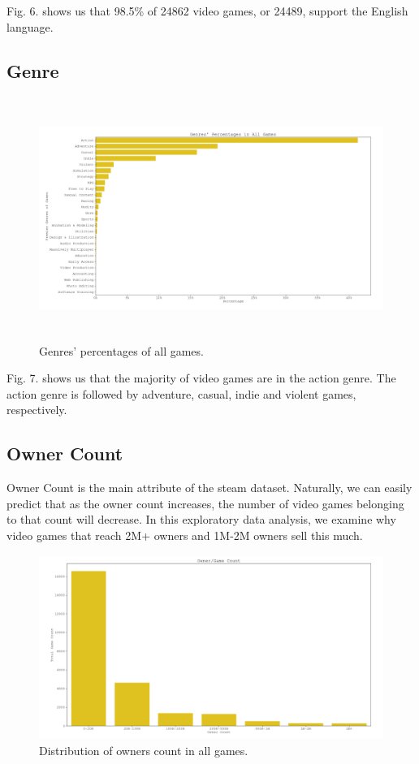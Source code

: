 \documentclass[conference]{IEEEtran}
\begin{document}
Fig. 6. shows us that 98.5\% of 24862 video games, or 24489, support the English language.

\subsection{Genre}


\begin{figure}[h]
  \centering
  \includegraphics[width=\linewidth,height=7.9cm]{assets/genres_dist.png}
  \caption{Genres' percentages of all games.}
  \label{fig:genre1}
\end{figure}

Fig. 7. shows us that the majority of video games are in the action genre. The action genre is followed by adventure, casual, indie and violent games, respectively. \\

\subsection{Owner Count}
Owner Count is the main attribute of the steam dataset. Naturally, we can easily predict that as the owner count increases, the number of video games belonging to that count will decrease. In this exploratory data analysis, we examine why video games that reach 2M+ owners and 1M-2M owners sell this much.

\begin{figure}[h]
  \includegraphics[width=\linewidth, height=6cm]{assets/owners_count.png}
  \caption{Distribution of owners count in all games.}
  \label{fig:ownercount1}
\end{figure}
\end{document}
